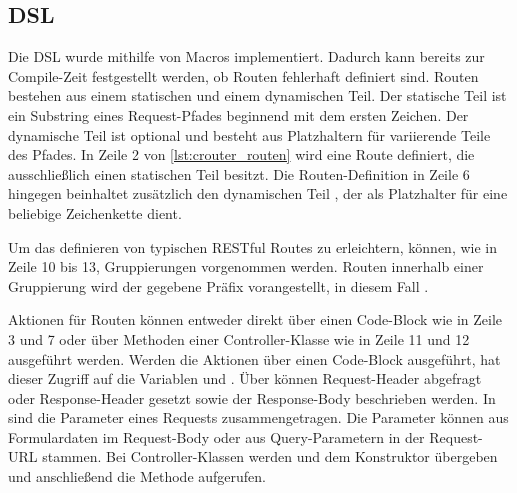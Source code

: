 \subsection{DSL}
\label{ssec:br_dsl}

Die DSL wurde mithilfe von Macros implementiert.  Dadurch kann bereits zur
Compile-Zeit festgestellt werden, ob Routen fehlerhaft definiert sind.  Routen
bestehen aus einem statischen und einem dynamischen Teil.  Der statische Teil
ist ein Substring eines Request-Pfades beginnend mit dem ersten Zeichen.  Der
dynamische Teil ist optional und besteht aus Platzhaltern für variierende Teile
des Pfades.  In Zeile 2 von \cref{lst:crouter_routen} wird eine Route
definiert, die ausschließlich einen statischen Teil besitzt.  Die
Routen-Definition in Zeile 6 hingegen beinhaltet zusätzlich den dynamischen
Teil , der als Platzhalter für eine beliebige Zeichenkette dient.

Um das definieren von typischen RESTful Routes zu erleichtern, können, wie in
Zeile 10 bis 13, Gruppierungen vorgenommen werden.  Routen innerhalb einer
Gruppierung wird der gegebene Präfix vorangestellt, in diesem Fall
.

Aktionen für Routen können entweder direkt über einen Code-Block wie in Zeile 3
und 7 oder über Methoden einer Controller-Klasse wie in Zeile 11 und 12
ausgeführt werden.  Werden die Aktionen über einen Code-Block ausgeführt, hat
dieser Zugriff auf die Variablen  und .  Über
 können Request-Header abgefragt oder Response-Header gesetzt
sowie der Response-Body beschrieben werden.  In  sind die
Parameter eines Requests zusammengetragen.  Die Parameter können aus
Formulardaten im Request-Body oder aus Query-Parametern in der Request-URL
stammen.  Bei Controller-Klassen werden  und  dem
Konstruktor übergeben und anschließend die Methode aufgerufen.


